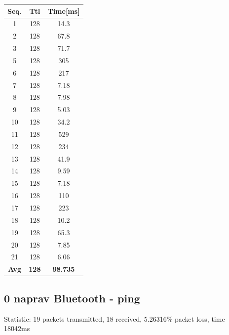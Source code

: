 \documentclass[11pt,a4paper,slovene]{article}
\begin{document}
 
\begin{table}[H]
	\begin{adjustwidth}{-3cm}{-3cm}
	\centering
		\begin{tabular}{c|c|c}
		\hline
		\textbf{Seq.} & \textbf{Ttl} & \textbf{Time[ms]}\\
     		\hline
     		1 & 128 & 14.3\\
  		2 & 128 & 67.8\\
  		3 & 128 & 71.7\\
  		5 & 128 & 305\\
  		6 & 128 & 217\\
  		7 & 128 & 7.18\\
  		8 & 128 & 7.98\\
  		9 & 128 & 5.03\\
  		10 & 128 & 34.2\\
  		11 & 128 & 529\\
  		12 & 128 & 234\\
  		13 & 128 & 41.9\\
  		14 & 128 & 9.59\\
  		15 & 128 & 7.18\\
  		16 & 128 & 110\\
  		17 & 128 & 223\\
  		18 & 128 & 10.2\\
  		19 & 128 & 65.3\\
  		20 & 128 & 7.85\\
  		21 & 128 & 6.06\\
  		\hline
  		\textbf{Avg} & \textbf{128} & \textbf{98.735}\\
  		\hline
  		\end{tabular}
    	\end{adjustwidth}
\end{table}

\subsection{0 naprav Bluetooth - ping}

Statistic: 19 packets transmitted, 18 received, 5.26316\% packet loss, time 18042ms
 
\end{document}
